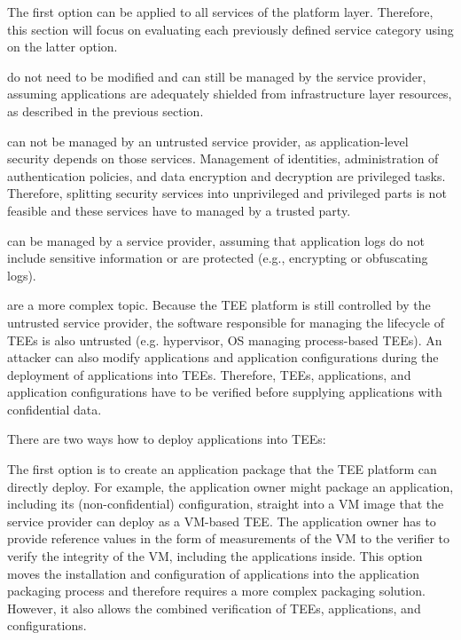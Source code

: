 The first option can be applied to all services of the platform layer.
Therefore, this section will focus on evaluating each previously defined service
category using on the latter option.

\begin{description}[style=standard]
  \item[Infrastructure Management Services] do not need to be modified and can
    still be managed by the service provider, assuming applications are
    adequately shielded from infrastructure layer resources, as described in the
    previous section.

  \item[Security Services] can not be managed by an untrusted service provider,
    as application-level security depends on those services. Management of
    identities, administration of authentication policies, and data encryption
    and decryption are privileged tasks. Therefore, splitting security services
    into unprivileged and privileged parts is not feasible and these services
    have to managed by a trusted party.

  \item[Monitoring and Logging Services] can be managed by a service provider,
    assuming that application logs do not include sensitive information or are
    protected (e.g., encrypting or obfuscating logs).

  \item[Application Orchestration Services] are a more complex topic. Because
    the TEE platform is still controlled by the untrusted service provider, the
    software responsible for managing the lifecycle of TEEs is also untrusted
    (e.g. hypervisor, OS managing process-based TEEs). An attacker can also
    modify applications and application configurations during the deployment of
    applications into TEEs. Therefore, TEEs, applications, and application
    configurations have to be verified before supplying applications with
    confidential data.

    There are two ways how to deploy applications into TEEs:

    The first option is to create an application package that the TEE platform
    can directly deploy. For example, the application owner might package an
    application, including its (non-confidential) configuration, straight into a
    VM image that the service provider can deploy as a VM-based TEE. The
    application owner has to provide reference values in the form of
    measurements of the VM to the verifier to verify the integrity of the VM,
    including the applications inside. This option moves the installation and
    configuration of applications into the application packaging process and
    therefore requires a more complex packaging solution. However, it also
    allows the combined verification of TEEs, applications, and configurations.


\end{description}
